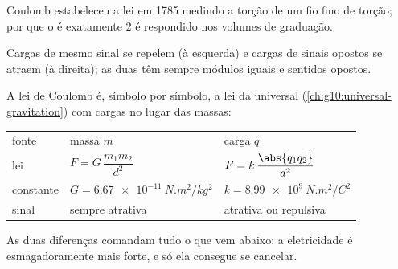 \begin{remark}\label{rem:g11:fundamental-interactions:torsion}
Coulomb estabeleceu a lei em 1785 medindo a torção de um fio fino de
torção; por que o  é exatamente $2$ é respondido nos volumes de
graduação.
\end{remark}

\begin{omfigure}
\qquad
{}

{\small Cargas de mesmo sinal se repelem (à esquerda) e cargas de sinais
opostos se atraem (à direita); as duas  têm sempre módulos iguais e
sentidos opostos.}
\end{omfigure}

\begin{remark}\label{rem:g11:fundamental-interactions:twin}
A lei de Coulomb é, símbolo por símbolo, a lei da  universal
(\cref{ch:g10:universal-gravitation}) com cargas no lugar das massas:
\begin{center}
\begin{tabular}{lll}
fonte & massa $m$ & carga $q$ \\
lei & $F = G\,\dfrac{m_1 m_2}{d^2}$ & $F = k\,\dfrac{\abs{q_1 q_2}}{d^2}$ \\[1.5ex]
constante & $G = \qty{6.67e-11}{N.m^2/kg^2}$ & $k = \qty{8.99e9}{N.m^2/C^2}$ \\
sinal & sempre atrativa & atrativa ou repulsiva \\
\end{tabular}
\end{center}
As duas diferenças comandam tudo o que vem abaixo: a eletricidade é
esmagadoramente mais forte, e só ela consegue se cancelar.
\end{remark}

